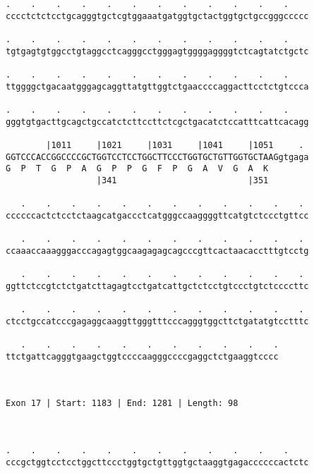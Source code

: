 \documentclass{article}
\begin{document}
\begin{Verbatim}
.    .    .    .    .    .    .    .    .    .    .    .    
cccctctctcctgcagggtgctcgtggaaatgatggtgctactggtgctgccgggccccc
                                                            
.    .    .    .    .    .    .    .    .    .    .    .    
tgtgagtgtggcctgtaggcctcagggcctgggagtggggaggggtctcagtatctgctc
                                                            
.    .    .    .    .    .    .    .    .    .    .    .    
ttggggctgacaatgggagcaggttatgttggtctgaaccccaggacttcctctgtccca
                                                            
.    .    .    .    .    .    .    .    .    .    .    .    
gggtgtgacttgcagctgccatctcttccttctcgctgacatctccatttcattcacagg
                                                            
        |1011     |1021     |1031     |1041     |1051     . 
GGTCCCACCGGCCCCGCTGGTCCTCCTGGCTTCCCTGGTGCTGTTGGTGCTAAGgtgaga
G  P  T  G  P  A  G  P  P  G  F  P  G  A  V  G  A  K        
                  |341                          |351        
  
   .    .    .    .    .    .    .    .    .    .    .    . 
ccccccactctcctctaagcatgaccctcatgggccaaggggttcatgtctccctgttcc
                                                            
   .    .    .    .    .    .    .    .    .    .    .    . 
ccaaaccaaagggacccagagtggcaagagagcagcccgttcactaacacctttgtcctg
                                                            
   .    .    .    .    .    .    .    .    .    .    .    . 
ggttctccgtctctgatcttagagtcctgatcattgctctcctgtccctgtctccccttc
                                                            
   .    .    .    .    .    .    .    .    .    .    .    . 
ctcctgccatcccgagaggcaaggttgggtttcccagggtggcttctgatatgtcctttc
                                                            
   .    .    .    .    .    .    .    .    .    .    .
ttctgattcagggtgaagctggtccccaagggccccgaggctctgaaggtcccc
                                                      
                                                      
 
Exon 17 | Start: 1183 | End: 1281 | Length: 98



.    .    .    .    .    .    .    .    .    .    .    .    
cccgctggtcctcctggcttccctggtgctgttggtgctaaggtgagaccccccactctc
                                                            

\end{Verbatim}
\end{document}
